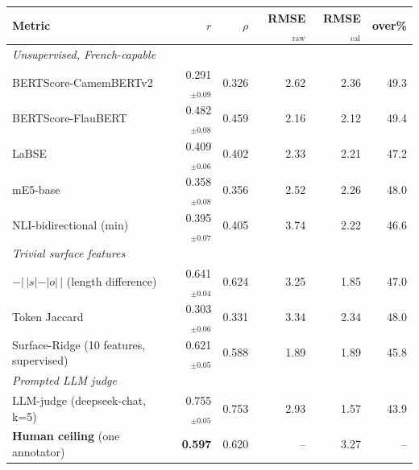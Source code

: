 \setlength{\tabcolsep}{4pt}
\begin{tabular}{lrrrrr}
\toprule
Metric & $r$ & $\rho$ & RMSE$_{\text{raw}}$ & RMSE$_{\text{cal}}$ & over\% \\
\midrule
\multicolumn{6}{l}{\emph{Unsupervised, French-capable}}\\
BERTScore-CamemBERTv2 & 0.291$_{\pm0.09}$ & 0.326 & 2.62 & 2.36 & 49.3 \\
BERTScore-FlauBERT & 0.482$_{\pm0.08}$ & 0.459 & 2.16 & 2.12 & 49.4 \\
LaBSE & 0.409$_{\pm0.06}$ & 0.402 & 2.33 & 2.21 & 47.2 \\
mE5-base & 0.358$_{\pm0.08}$ & 0.356 & 2.52 & 2.26 & 48.0 \\
NLI-bidirectional (min) & 0.395$_{\pm0.07}$ & 0.405 & 3.74 & 2.22 & 46.6 \\
\midrule
\multicolumn{6}{l}{\emph{Trivial surface features}}\\
$-|\,|s|-|o|\,|$ (length difference) & 0.641$_{\pm0.04}$ & 0.624 & 3.25 & 1.85 & 47.0 \\
Token Jaccard & 0.303$_{\pm0.06}$ & 0.331 & 3.34 & 2.34 & 48.0 \\
Surface-Ridge (10 features, supervised) & 0.621$_{\pm0.05}$ & 0.588 & 1.89 & 1.89 & 45.8 \\
\midrule
\multicolumn{6}{l}{\emph{Prompted LLM judge}}\\
LLM-judge (deepseek-chat, k=5) & 0.755$_{\pm0.05}$ & 0.753 & 2.93 & 1.57 & 43.9 \\
\midrule
\textbf{Human ceiling} (one annotator) & \textbf{0.597} & 0.620 & -- & 3.27 & -- \\
\bottomrule
\end{tabular}
